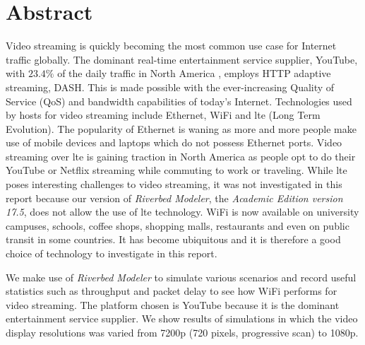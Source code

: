 
\chapter*{Abstract}

Video streaming is quickly becoming the most common use case for Internet traffic globally. The dominant real-time entertainment service supplier, YouTube, with $23.4\%$ of the daily traffic in North America \cite{sandvinereport}, employs \gls{HTTP} adaptive streaming, \gls{DASH}. This is made possible with the ever-increasing Quality of Service (\gls{QoS}) and bandwidth capabilities of today's Internet. Technologies used by hosts for video streaming include Ethernet, \gls{WiFi} and \gls{lte} (Long Term Evolution). The popularity of Ethernet is waning as more and more people make use of mobile devices and laptops which do not possess Ethernet ports. Video streaming over \gls{lte} is gaining traction in North America as people opt to do their YouTube or Netflix streaming while commuting to work or traveling. While \gls{lte} poses interesting challenges to video streaming, it was not investigated in this report because our version of \textit{Riverbed Modeler}, the \textit{Academic Edition version 17.5}, does not allow the use of \gls{lte} technology. \gls{WiFi} is now available on university campuses, schools, coffee shops, shopping malls, restaurants and even on public transit in some countries. It has become ubiquitous and it is therefore a good choice of technology to investigate in this report.

We make use of \textit{Riverbed Modeler} to simulate various scenarios and record useful statistics such as throughput and packet delay to see how \gls{WiFi} performs for video streaming. The platform chosen is YouTube because it is the dominant entertainment service supplier. We show results of simulations in which the video display resolutions was varied from 7200p (720 pixels, progressive scan) to 1080p.

%




\clearpage